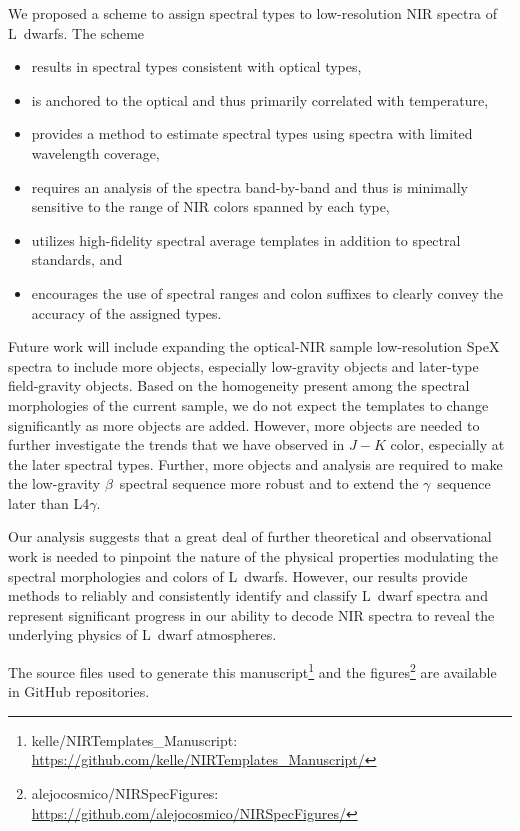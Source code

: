 \documentclass[modern]{aastex61}
\begin{document}
We proposed a scheme to assign spectral types to low-resolution NIR spectra of L~dwarfs.
The scheme
\begin{itemize}
  \item results in spectral types consistent with optical types,
  \item is anchored to the optical and thus primarily correlated with temperature,
  \item provides a method to estimate spectral types using spectra with limited wavelength coverage,
  \item requires an analysis of the spectra band-by-band and thus is minimally sensitive to the range of NIR colors spanned by each type,
  \item utilizes high-fidelity spectral average templates in addition to spectral standards, and
  \item encourages the use of spectral ranges and colon suffixes to clearly convey the accuracy of the assigned types.
\end{itemize}

Future work will include expanding the optical-NIR sample low-resolution SpeX spectra to include more objects, especially low-gravity objects and later-type field-gravity objects.
Based on the homogeneity present among the spectral morphologies of the current sample, we do not expect the templates to change significantly as more objects are added.
However, more objects are needed to further investigate the trends that we have observed in $J-K$ color, especially at the later spectral types.
Further, more objects and analysis are required to make the low-gravity $\beta$~spectral sequence more robust and to extend the $\gamma$~sequence later than L4$\gamma$.

Our analysis suggests that a great deal of further theoretical and observational work is needed to pinpoint the nature of the physical properties modulating the spectral morphologies and colors of L~dwarfs.
However, our results provide methods to reliably and consistently identify and classify L~dwarf spectra and represent significant progress in our ability to decode NIR spectra to reveal the underlying physics of L~dwarf atmospheres.

The source files used to generate this manuscript\footnote{kelle/NIRTemplates\_Manuscript: \url{https://github.com/kelle/NIRTemplates_Manuscript/}} and the figures\footnote{alejocosmico/NIRSpecFigures: \url{https://github.com/alejocosmico/NIRSpecFigures/}} are available in GitHub repositories.
\end{document}
